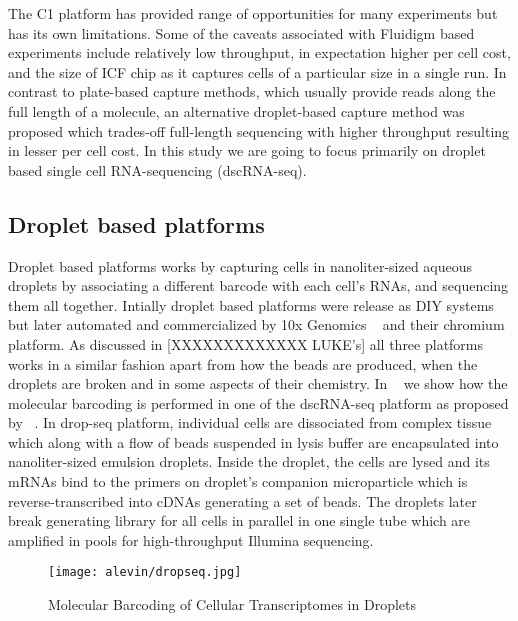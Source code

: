 The C1 platform has provided range of opportunities for many experiments but has its own limitations. Some of the caveats associated with Fluidigm based experiments include relatively low throughput, in expectation higher per cell cost, and the size of ICF chip as it captures cells of a particular size in a single run. In contrast to plate-based capture methods, which usually provide reads along the full length of a molecule, an alternative droplet-based capture method \citep{dropseq, indrop, tenx} was proposed which trades-off full-length sequencing with higher throughput resulting in lesser per cell cost. In this study we are going to focus primarily on droplet based single cell RNA-sequencing (dscRNA-seq).

\subsection{Droplet based platforms ~\citep{dropseq, indrop, tenx}} 
\label{intro:droplet}
Droplet based platforms works by capturing cells in nanoliter-sized aqueous droplets by associating a different barcode with each cell’s RNAs, and sequencing them all together. Intially droplet based platforms were release as DIY systems but later automated and commercialized by 10x Genomics ~\citep{tenx} and their chromium platform.
As discussed in [XXXXXXXXXXXXX LUKE's] all three platforms works in a similar fashion apart from how the beads are produced, when the droplets are broken and in some aspects of their chemistry. In ~ we show how the molecular barcoding is performed in one of the dscRNA-seq platform as proposed by ~\citep{dropseq}. In drop-seq platform, individual cells are dissociated from complex tissue which along with a flow of beads suspended in lysis buffer are encapsulated into nanoliter-sized emulsion droplets. Inside the droplet, the cells are lysed and its mRNAs bind to the primers on droplet's companion microparticle which is reverse-transcribed into cDNAs generating a set of beads. The droplets later break generating library for all cells in parallel in one single tube which are amplified in pools for high-throughput Illumina sequencing. 

\begin{figure*}
 \centering
 \texttt{[image: alevin/dropseq.jpg]}
  \caption{Molecular Barcoding of Cellular Transcriptomes in Droplets \citep{dropseq}}
  \label{fig:dropprep}
\end{figure*}

